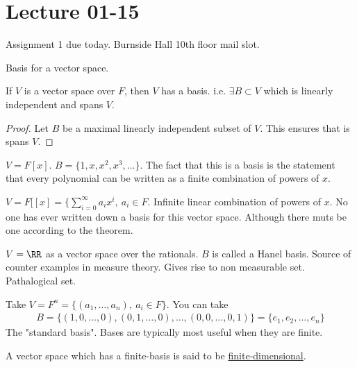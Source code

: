 \documentclass[class=scrartcl, crop=false]{standalone}
\date{2020-01-15}
\begin{document}
\section{Lecture 01-15}

Assignment 1 due today. Burnside Hall 10th floor mail slot.

Basis for a vector space. 

\begin{theorem}
  If $V$ is a vector space over $F$, then $V$ has a basis. i.e. $\exists B \subset V$ which is linearly independent and spans $V$.
  \begin{proof}
    Let $B$ be a maximal linearly independent subset of $V$. This ensures that is spans $V$.
  \end{proof} 
\end{theorem} 

\begin{example}
  $V = F[x]$. $B = \{1, x, x^2, x^3, \dots\}$. The fact that this is a basis is the statement that every polynomial can be written as a finite combination of powers of $x$.
\end{example} 

\begin{example}
  $V = F[[x] = \{\sum_{i = 0}^{\infty}a_ix^i, \ a_i \in F$. Infinite linear combination of powers of $x$. No one has ever written down a basis for this vector space. Although there muts be one according to the theorem.
\end{example} 

\begin{example}
  $V = \RR$ as a vector space over the rationals. $B$ is called a Hanel basis. Source of counter examples in measure theory. Gives rise to non measurable set. Pathalogical set.
\end{example} 

\begin{example}
  Take $V = F^n = \{(a_1, \dots, a_n), \ a_i \in F\}$. You can take 
  \begin{gather*}
    B = \{(1, 0, \dots, 0), (0, 1, \dots, 0), \dots, (0, 0, \dots, 0, 1)\} = \{e_1, e_2, \dots, e_n\}
  \end{gather*} 
  The "standard basis". Bases are typically most useful when they are finite.
\end{example} 

\begin{definition}
  A vector space which has a finite-basis is said to be \ul{finite-dimensional}.
\end{definition} 
\end{document}
